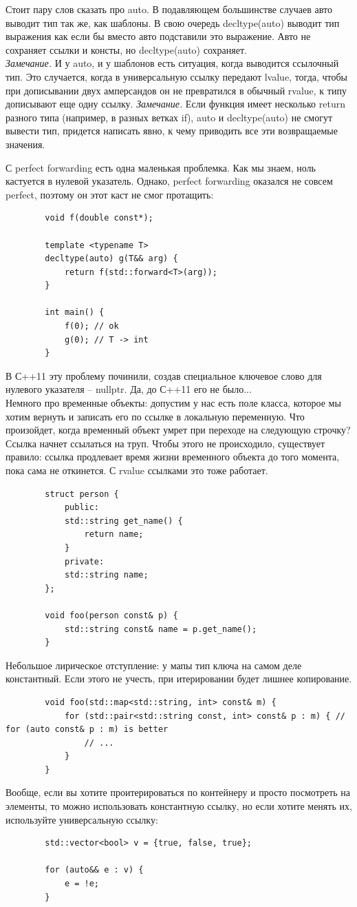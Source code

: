 \documentclass[12pt, a4paper]{article}
\begin{document}
	Стоит пару слов сказать про auto. В подавляющем большинстве случаев авто выводит тип так же, как шаблоны. В свою очередь decltype(auto) выводит тип выражения как если бы вместо авто подставили это выражение. Авто не сохраняет ссылки и консты, но decltype(auto) сохраняет.\\
	\textit{Замечание.} И у auto, и у шаблонов есть ситуация, когда выводится ссылочный тип. Это случается, когда в универсальную ссылку передают lvalue, тогда, чтобы при дописывании двух амперсандов он не превратился в обычный rvalue, к типу дописывают еще одну ссылку.
	\textit{Замечание.} Если функция имеет несколько return разного типа (например, в разных ветках if), auto и decltype(auto) не смогут вывести тип, придется написать явно, к чему приводить все эти возвращаемые значения.
	\par С perfect forwarding есть одна маленькая проблемка. Как мы знаем, ноль кастуется в нулевой указатель. Однако, perfect forwarding оказался не совсем perfect, поэтому он этот каст не смог протащить:
	\begin{verbatim}
		void f(double const*);
		
		template <typename T>
		decltype(auto) g(T&& arg) {
			return f(std::forward<T>(arg));
		}
		
		int main() {
			f(0); // ok
			g(0); // T -> int
		}
	\end{verbatim}
	В С++11 эту проблему починили, создав специальное ключевое слово для нулевого указателя -- nullptr. Да, до С++11 его не было...\\
	Немного про временные объекты: допустим у нас есть поле класса, которое мы хотим вернуть и записать его по ссылке в локальную переменную. Что произойдет, когда временный объект умрет при переходе на следующую строчку? Ссылка начнет ссылаться на труп. Чтобы этого не происходило, существует правило: ссылка продлевает время жизни временного объекта до того момента, пока сама не откинется. С rvalue ссылками это тоже работает.
	\begin{verbatim}
		struct person {
			public:
			std::string get_name() {
				return name;
			}
			private:
			std::string name;
		};
		
		void foo(person const& p) {
			std::string const& name = p.get_name();
		}
	\end{verbatim}
	Небольшое лирическое отступление: у мапы тип ключа на самом деле константный. Если этого не учесть, при итерировании будет лишнее копирование.
	\begin{verbatim}
		void foo(std::map<std::string, int> const& m) {
			for (std::pair<std::string const, int> const& p : m) { // for (auto const& p : m) is better
				// ...
			}
		}
	\end{verbatim}
	Вообще, если вы хотите проитерироваться по контейнеру и просто посмотреть на элементы, то можно использовать константную ссылку, но если хотите менять их, используйте универсальную ссылку:
	\begin{verbatim}
		std::vector<bool> v = {true, false, true};
		
		for (auto&& e : v) {
			e = !e;
		}
	\end{verbatim}
\end{document}
